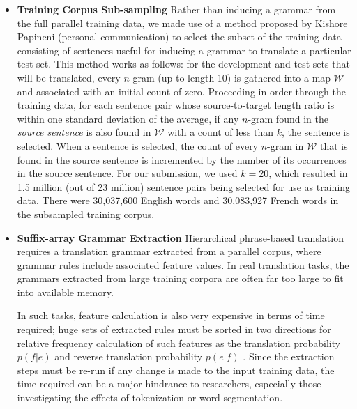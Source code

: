 \documentclass[11pt]{article}
\newcommand{\ignore}[1]{}
\begin{document}
\begin{itemize}
\item \textbf{Training Corpus Sub-sampling}
Rather than inducing a grammar from the full parallel training data, we made use of a method proposed by Kishore Papineni (personal communication) to select the subset of the training data consisting of sentences useful for inducing a grammar to translate a particular test set. This method works as follows: for the development and test sets that will be translated, every $n$-gram (up to length 10) is gathered into a map $\mathcal{W}$ and associated with an initial count of zero.  Proceeding in order through the training data, for each sentence pair whose source-to-target length ratio is within one standard deviation of the average, if any $n$-gram found in the \emph{source sentence} is also found in $\mathcal{W}$ with a count of less than $k$, the sentence is selected.  When a sentence is selected, the count of every $n$-gram in $\mathcal{W}$ that is found in the source sentence is incremented by the number of its occurrences in the source sentence. \ignore{Thus, there are two conditions in which a sentence will not be selected: 1) it only contains $n$-grams that are not found in $\mathcal{W}$ (making it useless for learning in the highly lexicalized models we use) or 2) it only contains $n$-grams that have already been attested in the selected set $k$ or more times.} For our submission, we used $k=20$, which resulted in 1.5 million (out of 23 million) sentence pairs being selected for use as training data.  There were 30,037,600 English words and 30,083,927 French words in the subsampled training corpus.

\item \textbf{Suffix-array Grammar Extraction}
Hierarchical phrase-based translation requires a translation grammar extracted from a parallel corpus, where grammar rules include associated feature values. In real translation tasks, the grammars extracted from large training corpora are often far too large to fit into available memory.

In such tasks, feature calculation is also very expensive in terms of time required; huge sets of extracted rules must be sorted in two directions for relative frequency calculation of such features as the translation probability $p(f|e)$ and reverse translation probability $p(e|f)$ \cite{Koehn2003}. Since the extraction steps must be re-run if any change is made to the input training data, the time required can be a major hindrance to researchers, especially those investigating the effects of tokenization or word segmentation.


\end{itemize}
\end{document}
